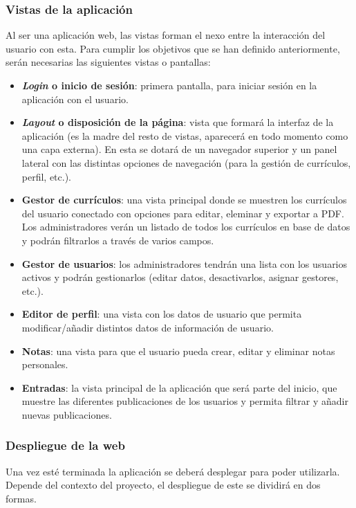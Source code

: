 \subsubsection{Vistas de la aplicación}
Al ser una aplicación web, las vistas forman el nexo entre la interacción del usuario con esta. Para cumplir los objetivos que se han definido anteriormente, serán necesarias las siguientes vistas o pantallas:
\begin{itemize}
 \item \textbf{\emph{Login} o inicio de sesión}: primera pantalla, para iniciar sesión en la aplicación con el usuario.
 \item \textbf{\emph{Layout} o disposición de la página}: vista que formará la interfaz de la aplicación (es la madre del resto de vistas, aparecerá en todo momento como una capa externa). En esta se dotará de un navegador superior y un panel lateral con las distintas opciones de navegación (para la gestión de currículos, perfil, etc.).
 \item \textbf{Gestor de currículos}: una vista principal donde se muestren los currículos del usuario conectado con opciones para editar, eleminar y exportar a PDF. Los administradores verán
 un listado de todos los currículos en base de datos y podrán filtrarlos a través
 de varios campos.
 \item \textbf{Gestor de usuarios}: los administradores tendrán una lista con los usuarios activos
 y podrán gestionarlos (editar datos, desactivarlos, asignar gestores, etc.).
 \item \textbf{Editor de perfil}: una vista con los datos de usuario que permita modificar/añadir distintos datos de información de usuario.
 \item \textbf{Notas}: una vista para que el usuario pueda crear, editar y eliminar notas personales.
 \item \textbf{Entradas}: la vista principal de la aplicación que será parte del inicio, que muestre las diferentes publicaciones de los usuarios y permita filtrar y añadir nuevas publicaciones.
\end{itemize}

\subsubsection{Despliegue de la web}
Una vez esté terminada la aplicación se deberá desplegar para poder utilizarla. Depende del contexto del proyecto, el despliegue de este se dividirá en dos formas.

